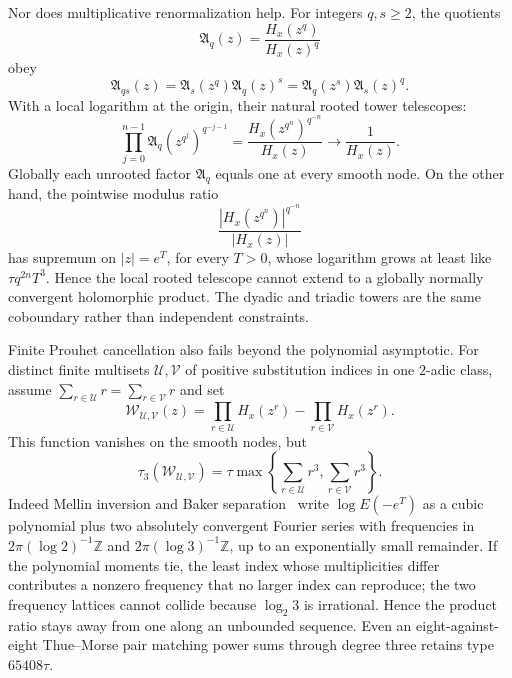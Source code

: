 \documentclass[11pt,oneside]{article}
\theoremstyle{definition}
\theoremstyle{remark}
\newcommand{\Z}{\mathbb Z}
\begin{document}
Nor does multiplicative renormalization help.  For integers $q,s\ge2$, the quotients
\[
 \mathfrak A_q(z)=\frac{H_x(z^q)}{H_x(z)^q}
\]
obey
\begin{equation}
 \mathfrak A_{qs}(z)=\mathfrak A_s(z^q)\mathfrak A_q(z)^s
 =\mathfrak A_q(z^s)\mathfrak A_s(z)^q.
 \label{crit:eq-power-substitution-cocycle}
\end{equation}
With a local logarithm at the origin, their natural rooted tower telescopes:
\[
 \prod_{j=0}^{n-1}\mathfrak A_q(z^{q^j})^{q^{-j-1}}
 =\frac{H_x(z^{q^n})^{q^{-n}}}{H_x(z)}\longrightarrow\frac1{H_x(z)}.
\]
Globally each unrooted factor $\mathfrak A_q$ equals one at every smooth node.  On the other
hand, the pointwise modulus ratio
\[
 \frac{|H_x(z^{q^n})|^{q^{-n}}}{|H_x(z)|}
\]
has supremum on $|z|=e^T$, for every $T>0$, whose logarithm grows at least like
$\tau q^{2n}T^3$.  Hence the local rooted telescope cannot extend to a globally
normally convergent holomorphic product.  The dyadic and triadic towers are the same
coboundary rather than independent constraints.

Finite Prouhet cancellation also fails beyond the polynomial asymptotic.  For distinct
finite multisets $\mathcal U,\mathcal V$ of positive substitution indices in one $2$-adic
class, assume $\sum_{r\in\mathcal U}r=\sum_{r\in\mathcal V}r$ and set
\[
 \mathcal W_{\mathcal U,\mathcal V}(z)
 =\prod_{r\in\mathcal U}H_x(z^r)-\prod_{r\in\mathcal V}H_x(z^r).
\]
This function vanishes on the smooth nodes, but
\begin{equation}
 \tau_3(\mathcal W_{\mathcal U,\mathcal V})
 =\tau\max\left\{\sum_{r\in\mathcal U}r^3,\sum_{r\in\mathcal V}r^3\right\}.
 \label{crit:eq-prouhet-composition-type}
\end{equation}
Indeed Mellin inversion and Baker separation~\cite{Baker1975} write $\log E(-e^T)$ as a
cubic polynomial plus two absolutely convergent Fourier series with frequencies in
$2\pi(\log2)^{-1}\Z$ and
$2\pi(\log3)^{-1}\Z$, up to an exponentially small remainder.  If the polynomial moments tie,
the least index whose multiplicities differ contributes a nonzero frequency that no larger
index can reproduce; the two frequency lattices cannot collide because $\log_2 3$ is
irrational.  Hence the product ratio stays away from one along an unbounded sequence.  Even
an eight-against-eight Thue--Morse pair matching power sums through degree three retains
type $65408\tau$.
\end{document}
